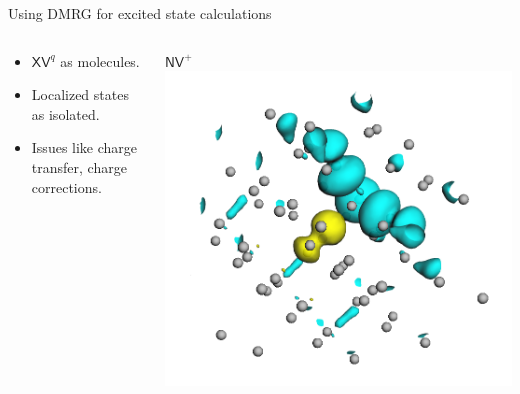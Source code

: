 \documentclass[]{beamer}
\begin{document}
\begin{frame}{Using DMRG for excited state calculations}
  \begin{columns}
    \begin{column}{0.5\textwidth}
      \begin{itemize}
        \item $ \mathsf{XV}^{q} $ as molecules.
        \item Localized states as isolated.
        \item Issues like charge transfer, charge corrections.
      \end{itemize}
    \end{column}
    \begin{column}{0.5\textwidth}
      \centering
      \textit{ $ \mathsf{NV}^{+} $ }
      \includegraphics[clip, trim=2cm 0 2cm 0, width=1.0\textwidth]{images/nv_plus_orbitals_example.png}
    \end{column}
  \end{columns}
\end{frame}


\end{document}

